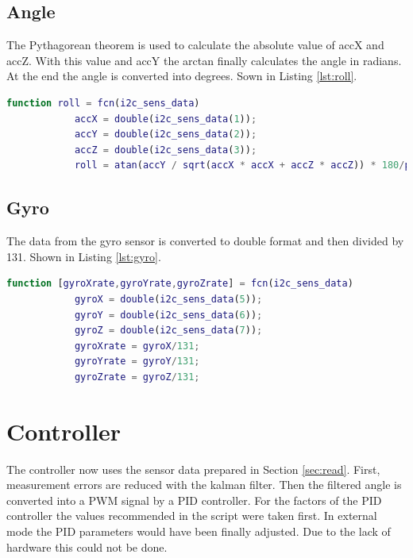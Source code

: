 	\subsection{Angle}
	The Pythagorean theorem is used to calculate the absolute value of accX and accZ. With this value and accY the arctan finally calculates the angle in radians. At the end the angle is converted into degrees. Sown in Listing \ref{lst:roll}.
		\begin{mdframed}
			\begin{lstlisting}[caption={Conversion from the acceleration to the angle}, language=matlab,label={lst:roll}]
			function roll = fcn(i2c_sens_data)
			accX = double(i2c_sens_data(1));
			accY = double(i2c_sens_data(2));
			accZ = double(i2c_sens_data(3));
			roll = atan(accY / sqrt(accX * accX + accZ * accZ)) * 180/pi;		
			\end{lstlisting}
		\end{mdframed}
	
	\subsection{Gyro}
	The data from the gyro sensor is converted to double format and then divided by 131. Shown in Listing \ref{lst:gyro}.
		\begin{mdframed}
			\begin{lstlisting}[caption={Conversion to the gyros}, language=matlab,label={lst:gyro}]
			function [gyroXrate,gyroYrate,gyroZrate] = fcn(i2c_sens_data)
			gyroX = double(i2c_sens_data(5));
			gyroY = double(i2c_sens_data(6));
			gyroZ = double(i2c_sens_data(7));
			gyroXrate = gyroX/131;
			gyroYrate = gyroY/131;
			gyroZrate = gyroZ/131;	
			\end{lstlisting}
		\end{mdframed}
	
%	

\section{Controller}
The controller now uses the sensor data prepared in Section \ref{sec:read}. First, measurement errors are reduced with the kalman filter.
Then the filtered angle is converted into a PWM signal by a PID controller.
For the factors of the PID controller the values recommended in the script were taken first. In external mode the PID parameters would have been finally adjusted. Due to the lack of hardware this could not be done. \\

